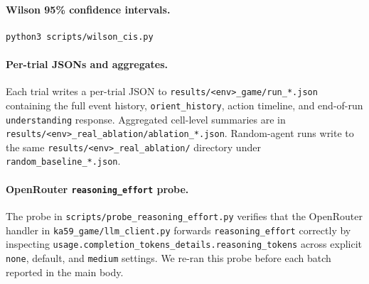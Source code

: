 \documentclass{article}
\begin{document}
\paragraph{Wilson 95\% confidence intervals.}
\begin{verbatim}
python3 scripts/wilson_cis.py
\end{verbatim}

\paragraph{Per-trial JSONs and aggregates.}
Each trial writes a per-trial JSON to \texttt{results/<env>\_game/run\_*.json} containing the full event history, \texttt{orient\_history}, action timeline, and end-of-run \texttt{understanding} response. Aggregated cell-level summaries are in \texttt{results/<env>\_real\_ablation/ablation\_*.json}. Random-agent runs write to the same \texttt{results/<env>\_real\_ablation/} directory under \texttt{random\_baseline\_*.json}.

\paragraph{OpenRouter \texttt{reasoning\_effort} probe.}
The probe in \texttt{scripts/probe\_reasoning\_effort.py} verifies that the OpenRouter handler in \texttt{ka59\_game/llm\_client.py} forwards \texttt{reasoning\_effort} correctly by inspecting \texttt{usage.completion\_tokens\_details.reasoning\_tokens} across explicit \texttt{none}, default, and \texttt{medium} settings. We re-ran this probe before each batch reported in the main body.

\newpage

\end{document}
